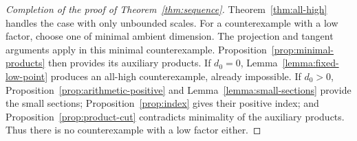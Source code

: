 \begin{proof}[Completion of the proof of Theorem~\ref{thm:sequence}]
Theorem~\ref{thm:all-high} handles the case with only unbounded
scales.  For a counterexample with a low factor, choose one of
minimal ambient dimension.  The projection and tangent arguments
apply in this minimal counterexample.  Proposition~\ref{prop:minimal-products}
then provides its auxiliary products.  If $d_0=0$,
Lemma~\ref{lemma:fixed-low-point} produces an all-high
counterexample, already impossible.  If $d_0>0$,
Proposition~\ref{prop:arithmetic-positive} and
Lemma~\ref{lemma:small-sections} provide the small sections;
Proposition~\ref{prop:index} gives their positive index; and
Proposition~\ref{prop:product-cut} contradicts minimality of the
auxiliary products.  Thus there is no counterexample with a low
factor either.
\end{proof}
